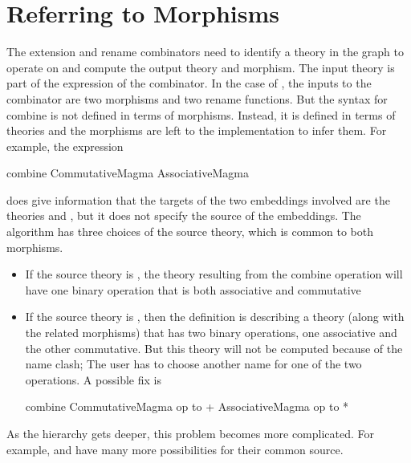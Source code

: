\section{Referring to Morphisms}
\label{subsec:overPart}
The extension and rename combinators need to identify a theory in the graph to operate on and compute the output theory and morphism. The input theory is part of the expression of the combinator. 
In the case of , the inputs to the combinator are two morphisms and two rename functions. But the syntax for combine is not defined in terms of morphisms. Instead, it is defined in terms of theories and the morphisms are left to the implementation to infer them. 
For example, the expression 
\begin{togcode}
combine CommutativeMagma {} AssociativeMagma {}
\end{togcode}
\noindent does give information that the targets of the two embeddings involved are the theories   and , but it does not specify the source of the embeddings. The algorithm has three choices of the source theory, which is common to both morphisms. 
\begin{itemize}
    \item If the source theory is , the theory resulting from the combine operation will have one binary operation that is both associative and commutative 
    \item If the source theory is , then the definition is describing a theory (along with the related morphisms) that has two binary operations, one associative and the other commutative. But this theory will not be computed because of the name clash; The user has to choose another name for one of the two operations. A possible fix is 
    \begin{togcode}
combine CommutativeMagma {op to +} AssociativeMagma {op to *}
    \end{togcode}
\end{itemize}
As the hierarchy gets deeper, this problem becomes more complicated. For example,  and  have many more possibilities for their common source. 


